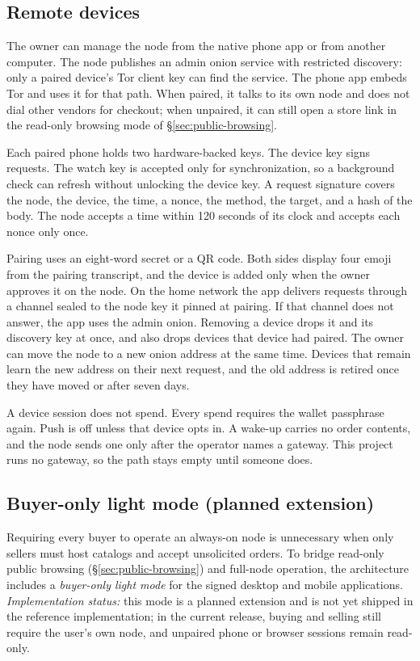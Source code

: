 \subsection{Remote devices}
\label{sec:remote}

The owner can manage the node from the native phone app or from another computer. The node publishes an admin onion service with restricted discovery: only a paired device's Tor client key can find the service. The phone app embeds Tor and uses it for that path. When paired, it talks to its own node and does not dial other vendors for checkout; when unpaired, it can still open a store link in the read-only browsing mode of \S\ref{sec:public-browsing}.

Each paired phone holds two hardware-backed keys. The device key signs requests. The watch key is accepted only for synchronization, so a background check can refresh without unlocking the device key. A request signature covers the node, the device, the time, a nonce, the method, the target, and a hash of the body. The node accepts a time within 120 seconds of its clock and accepts each nonce only once.

Pairing uses an eight-word secret or a QR code. Both sides display four emoji from the pairing transcript, and the device is added only when the owner approves it on the node. On the home network the app delivers requests through a channel sealed to the node key it pinned at pairing. If that channel does not answer, the app uses the admin onion. Removing a device drops it and its discovery key at once, and also drops devices that device had paired. The owner can move the node to a new onion address at the same time. Devices that remain learn the new address on their next request, and the old address is retired once they have moved or after seven days.

A device session does not spend. Every spend requires the wallet passphrase again. Push is off unless that device opts in. A wake-up carries no order contents, and the node sends one only after the operator names a gateway. This project runs no gateway, so the path stays empty until someone does.

\subsection{Buyer-only light mode (planned extension)}
\label{sec:light-buyer}

Requiring every buyer to operate an always-on node is unnecessary when only sellers must host catalogs and accept unsolicited orders. To bridge read-only public browsing (\S\ref{sec:public-browsing}) and full-node operation, the architecture includes a \emph{buyer-only light mode} for the signed desktop and mobile applications. \emph{Implementation status:} this mode is a planned extension and is not yet shipped in the reference implementation; in the current release, buying and selling still require the user's own node, and unpaired phone or browser sessions remain read-only.

